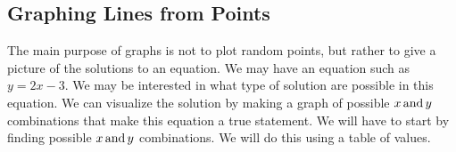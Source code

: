\subsection{Graphing Lines from Points}\pp

 {}\pp

 The main purpose of graphs is not to plot random points, but rather to give a
picture of the solutions to an equation. We may have an equation such as $y =
2 x - 3$. We may be interested in what type of solution are possible in this
equation. We can visualize the solution by making a graph of possible $x
\operatorname{and} y$ combinations that make this equation a true statement. We will
have to start by finding possible $x \operatorname{and} y$ combinations. We will do
this using a table of values.

